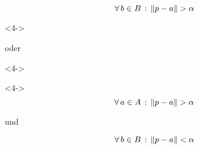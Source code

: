 \documentclass{beamer}
\newcommand{\fa}[1]{\forall \, {#1} \,:\,}
\DeclarePairedDelimiter\norm{\lVert}{\rVert}%
\begin{document}
\begin{frame}
\begin{definition}
\begin{minipage}{0.39 \linewidth}
\begin{uncoverenv}
        \[ \fa{b \in B} \norm{p - a} > \alpha \]
        \vspace{-20pt}
      \end{uncoverenv}
    \end{minipage}
    \begin{minipage}{0.19 \linewidth}
      \begin{uncoverenv}<4->
        \vspace{8pt}
        \begin{center}
          oder
        \end{center}
      \end{uncoverenv}
    \end{minipage}
    \begin{minipage}{0.39 \linewidth}
      \begin{uncoverenv}<4->
        \vspace{10pt}
        \begin{center}
          \colorbox{white}{
          }
        \end{center}
      \end{uncoverenv}
      \begin{uncoverenv}<4->
        \[ \fa{a \in A} \norm{p - a} > \alpha \]
        \vspace{-30pt}

        \begin{center}
          und
        \end{center}
        \vspace{-34pt}

        \[ \fa{b \in B} \norm{p - a} < \alpha \]
        \vspace{-20pt}
      \end{uncoverenv}
    \end{minipage}
  \end{definition}
\end{frame}
\end{document}
